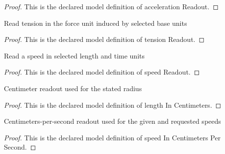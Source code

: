 \begin{proof}
  This is the declared model definition of acceleration Readout.
\end{proof}
\begin{definition}
  \label{def:physics:phyx-mini-0306:phyxminiproblems-problemphyxmini0306-tensionreadout}
  Read tension in the force unit induced by selected base units
\end{definition}
\begin{proof}
  This is the declared model definition of tension Readout.
\end{proof}
\begin{definition}
  \label{def:physics:phyx-mini-0306:phyxminiproblems-problemphyxmini0306-speedreadout}
  Read a speed in selected length and time units
\end{definition}
\begin{proof}
  This is the declared model definition of speed Readout.
\end{proof}
\begin{definition}
  \label{def:physics:phyx-mini-0306:phyxminiproblems-problemphyxmini0306-lengthincentimeters}
  Centimeter readout used for the stated radius
\end{definition}
\begin{proof}
  This is the declared model definition of length In Centimeters.
\end{proof}
\begin{definition}
  \label{def:physics:phyx-mini-0306:phyxminiproblems-problemphyxmini0306-speedincentimeterspersecond}
  Centimeters-per-second readout used for the given and requested speeds
\end{definition}
\begin{proof}
  This is the declared model definition of speed In Centimeters Per Second.
\end{proof}
